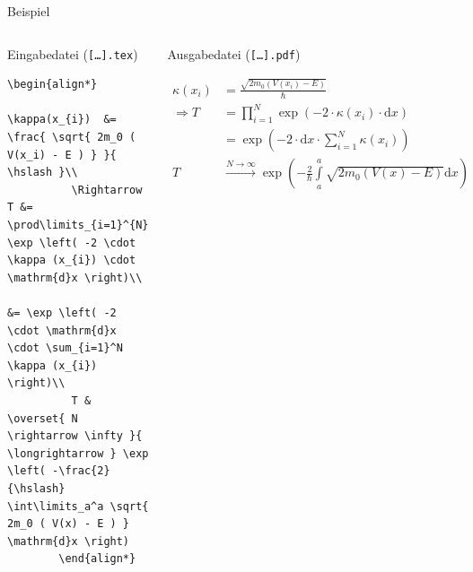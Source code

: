 \documentclass["WS\space 16-17\space -\space LaTeX-Kurs\space -\space Praesentation\space -\space 1.tex"]{subfiles}
\begin{document}
\begin{frame}[fragile,t]{Beispiel}
  \begin{columns}[t]
    \begin{block}{Eingabedatei (\texttt{[\ldots].tex})}
      \begin{lstlisting}[gobble=8]
        \begin{align*}
          \kappa(x_{i})  &= \frac{ \sqrt{ 2m_0 ( V(x_i) - E ) } }{ \hslash }\\
          \Rightarrow T &= \prod\limits_{i=1}^{N} \exp \left( -2 \cdot \kappa (x_{i}) \cdot \mathrm{d}x \right)\\
                         &= \exp \left( -2 \cdot \mathrm{d}x \cdot \sum_{i=1}^N \kappa (x_{i}) \right)\\
          T & \overset{ N \rightarrow \infty }{ \longrightarrow } \exp \left( -\frac{2}{\hslash} \int\limits_a^a \sqrt{ 2m_0 ( V(x) - E ) } \mathrm{d}x \right)
        \end{align*}
      \end{lstlisting}
    \end{block}
    \begin{block}{Ausgabedatei (\texttt{[\ldots].pdf})}
      \begin{outputbox}
        \small
        \begin{align*}
          \kappa(x_{i})  &=\frac{ \sqrt{2m_0(V(x_i)-E)} }{\hslash}\\
          \Rightarrow T &=\prod\limits_{i=1}^{N} \exp\left(-2\cdot\kappa(x_{i})\cdot\mathrm{d}x\right)\\
                        &=\exp\left(-2\cdot\mathrm{d}x\cdot\sum_{i=1}^N\kappa(x_{i})\right)\\
          T&\overset{N\rightarrow\infty}{\longrightarrow}\exp\left(-\frac{2}{\hslash}\int\limits_a^a\sqrt{2m_0(V(x)-E)}\mathrm{d}x\right)
        \end{align*}
        \normalsize
      \end{outputbox}
    \end{block}
  \end{columns}
\end{frame}
\end{document}
